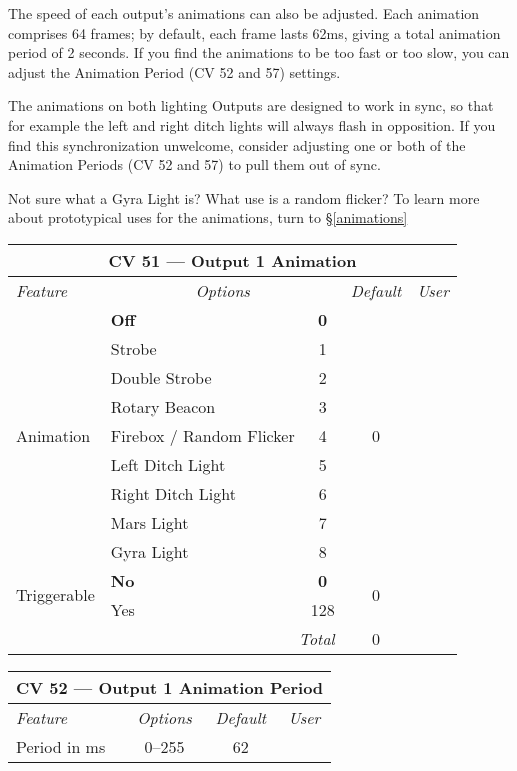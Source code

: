 \documentclass[12pt,letterpaper,draft]{memoir} %
\begin{document}
The speed of each output's animations can also be adjusted. Each animation comprises 64 frames; by default, each frame lasts 62ms, giving a total animation period of 2 seconds. If you find the animations to be too fast or too slow, you can adjust the Animation Period (CV 52 and 57) settings.

The animations on both lighting Outputs are designed to work in sync, so that for example the left and right ditch lights will always flash in opposition. If you find this synchronization unwelcome, consider adjusting one or both of the Animation Periods (CV 52 and 57) to pull them out of sync.

Not sure what a Gyra Light is? What use is a random flicker? To learn more about prototypical uses for the animations, turn to \S\ref{animations}

\label{CV51}
\begin{center}
\begin{tabular}{|l|lc|c|c|}
\hline
\multicolumn{5}{|c|}{\textbf{CV 51 --- Output 1 Animation}} \\ \hline \hline
\textit{Feature} & \multicolumn{2}{c|}{\textit{Options}} & \textit{Default} & \textit{User} \\ \hline
\multirow{9}{*}{Animation}		& \textbf{Off}		& \textbf{0} 		& \multirow{9}{*}{0} 	&\\
			& Strobe 			& 1 		& 				& \\ 
			& Double Strobe	& 2 		& 				& \\ 
			& Rotary Beacon 	& 3 		& 				& \\ 
			& Firebox / Random Flicker 			& 4 		& 				& \\ 
			& Left Ditch Light 	& 5 		& 				& \\ 
			& Right Ditch Light 	& 6 		& 				& \\
			& Mars Light 		& 7 		& 				& \\
			& Gyra Light 		& 8 		& 				& \\ \hline
\multirow{2}{*}{Triggerable}	& \textbf{No}		& \textbf{0} 		& \multirow{2}{*}{0} 	&\\
			& Yes	 		& 128	& 				& \\ \hline\hline
\multicolumn{3}{|r|}{\textit{Total}} & 0 &\\ \hline
\end{tabular}
\end{center}

\label{CV52}
\begin{center}
\begin{tabular}{|l|c|c|c|}
\hline
\multicolumn{4}{|c|}{\textbf{CV 52 --- Output 1 Animation Period}} \\ \hline \hline
\textit{Feature} & \textit{Options} & \textit{Default} & \textit{User} \\ \hline
Period in ms & 0--255 & 62 &\\ \hline
\end{tabular}
\end{center}
\end{document}
